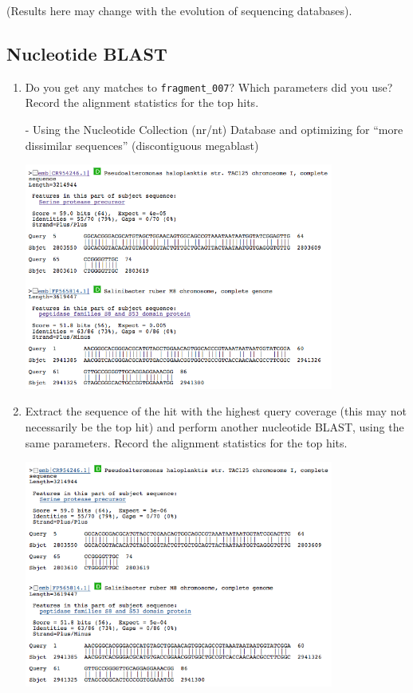 \documentclass[a4paper,11pt]{article}
\begin{document}
(Results here may change with the evolution of sequencing databases).

\subsection{Nucleotide BLAST}

\begin{enumerate}
\item Do you get any matches to \texttt{fragment\_007}? Which parameters did you use? Record the alignment statistics for the top hits.

- Using the Nucleotide Collection (nr/nt) Database and optimizing for ``more dissimilar sequences''
(discontiguous megablast)

\vspace{0.5cm}
\begin{center}
\includegraphics[width=0.8\textwidth]{blastn1.png}
\end{center}
\vspace{0.5cm}

\item Extract the sequence of the hit with the highest query coverage (this may not necessarily be the top hit) and perform another nucleotide BLAST, using the same parameters. Record the alignment statistics for the top hits.

\vspace{0.5cm}
\begin{center}
\includegraphics[width=0.8\textwidth]{blastn2.png}
\end{center}
\vspace{0.5cm}


\end{enumerate}
\end{document}

